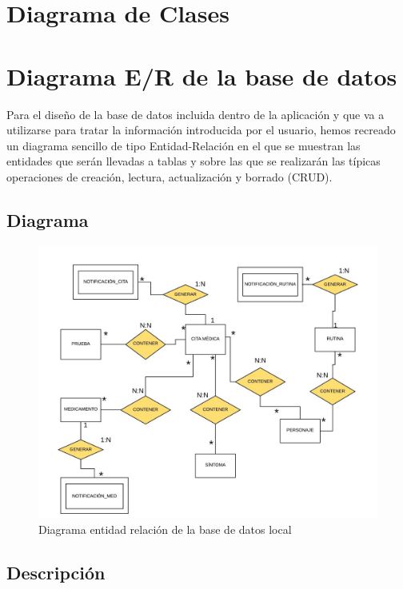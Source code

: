 \documentclass[../pfc.tex]{subfiles}
\begin{document}
	\section{Diagrama de Clases}
	


	\section{Diagrama E/R de la base de datos}
	

	Para el diseño de la base de datos incluida dentro de la aplicación y que va a utilizarse para tratar la información introducida por el usuario, hemos recreado un diagrama sencillo de tipo Entidad-Relación en el que se muestran las entidades que serán llevadas a tablas y sobre las que se realizarán las típicas operaciones de creación, lectura, actualización y borrado (CRUD).

	
		\subsection{Diagrama}
		
		\begin{figure}[H]
			\centering
			\includegraphics[width=1\linewidth]{../images/diagrama_e_r}
			\caption{Diagrama entidad relación de la base de datos local}
			\label{fig:diagramaer}
		\end{figure}
		
		\subsection{Descripción}
		
\end{document}
